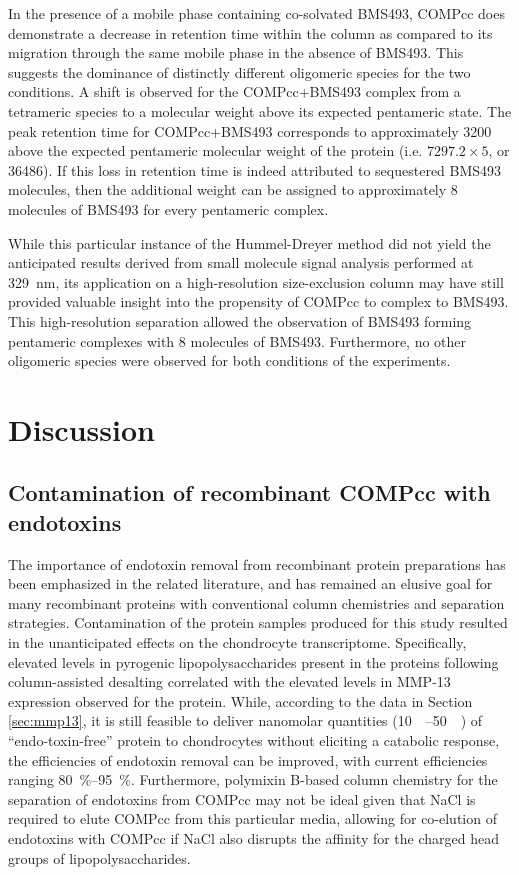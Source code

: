 \begin{refsection}
In the presence of a mobile phase containing co-solvated BMS493, COMPcc does
demonstrate a decrease in retention time within the column as compared to its
migration through the same mobile phase in the absence of BMS493. This suggests
the dominance of distinctly different oligomeric species for the two conditions.
A shift is observed for the COMPcc+BMS493 complex from a tetrameric species to a
molecular weight above its expected pentameric state. The peak retention time
for COMPcc+BMS493 corresponds to approximately \SI{3200}{\Da} above the expected
pentameric molecular weight of the protein (i.e. ${7297.2 \times 5}$, or
\SI{36486}{\Da}). If this loss in retention time is indeed attributed to
sequestered BMS493 molecules, then the additional weight can be assigned to
approximately 8 molecules of BMS493 for every pentameric complex.

While this particular instance of the Hummel-Dreyer method did not yield the
anticipated results derived from small molecule signal analysis performed at
\SI{329}{\nm}, its application on a high-resolution size-exclusion column may
have still provided valuable insight into the propensity of COMPcc to complex to
BMS493. This high-resolution separation allowed the observation of BMS493
forming pentameric complexes with 8 molecules of BMS493. Furthermore, no other
oligomeric species were observed for both conditions of the experiments.

\section{Discussion}
\subsection{Contamination of recombinant COMPcc with endotoxins}
The importance of endotoxin removal from recombinant protein preparations has
been emphasized in the related literature,\cite{Petsch2000,Sengupta2010} and
has remained an elusive goal for many recombinant proteins with conventional
column chemistries and separation strategies.\cite{Chen2009,Liu1997,Ritzen2007}
Contamination of the protein samples produced for this study resulted in the
unanticipated effects on the chondrocyte transcriptome. Specifically, elevated
levels in pyrogenic lipopolysaccharides present in the proteins following
column-assisted desalting correlated with the elevated levels in MMP-13
expression observed for the protein. While, according to the data in Section
\ref{sec:mmp13}, it is still feasible to deliver nanomolar quantities
(\SIrange{10}{50}{\nano\moLar}) of ``endo-toxin-free'' protein to chondrocytes
without eliciting a catabolic response, the efficiencies of endotoxin removal
can be improved, with current efficiencies ranging \SIrange{80}{95}{\percent}.
Furthermore, polymixin B-based column chemistry for the separation of endotoxins
from COMPcc may not be ideal given that NaCl is required to elute COMPcc from this
particular media, allowing for co-elution of endotoxins with COMPcc if NaCl also
disrupts the affinity for the charged head groups of lipopolysaccharides.


\end{refsection}
